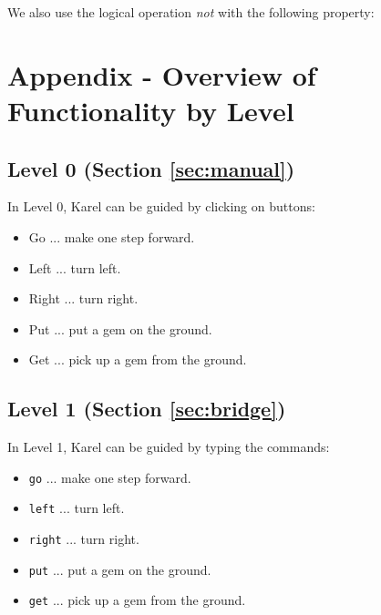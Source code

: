 \begin{center}
\end{center}
\vspace{4mm}
\noindent
We also use the logical operation {\em not} with the following property:\\

\begin{center}
\end{center}


\section{Appendix - Overview of Functionality by Level}\label{sec:newfunc3}

\subsection{Level 0 (Section \ref{sec:manual})}

In Level 0, Karel can be guided by clicking on buttons:
\begin{itemize}
\item Go ... make one step forward.
\item Left ... turn left.
\item Right ... turn right.
\item Put ... put a gem on the ground.
\item Get ... pick up a gem from the ground.
\end{itemize}

\subsection{Level 1 (Section \ref{sec:bridge})}

In Level 1, Karel can be guided by typing the commands:
\begin{itemize}
\item {\tt go} ... make one step forward.
\item {\tt left} ... turn left.
\item {\tt right} ... turn right.
\item {\tt put} ... put a gem on the ground.
\item {\tt get} ... pick up a gem from the ground.
\end{itemize}

